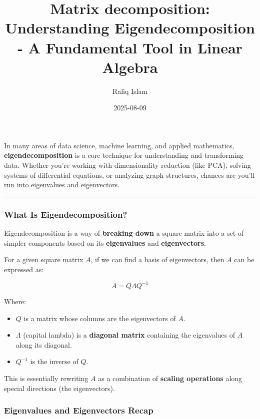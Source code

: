 \documentclass[
  letterpaper,
  DIV=11,
  numbers=noendperiod]{scrartcl}
\title{Matrix decomposition: Understanding Eigendecomposition - A
Fundamental Tool in Linear Algebra}
\author{Rafiq Islam}
\date{2025-08-09}
\providecommand{\tightlist}{%
  \setlength{\itemsep}{0pt}\setlength{\parskip}{0pt}}\usepackage{longtable,booktabs,array}
\renewcommand*\contentsname{Table of contents}
\newcommand\contentsname{Table of contents}
\begin{document}
\maketitle

\renewcommand*\contentsname{Table of contents}
{
\hypersetup{linkcolor=}
\setcounter{tocdepth}{4}
\tableofcontents
}

In many areas of data science, machine learning, and applied
mathematics, \textbf{eigendecomposition} is a core technique for
understanding and transforming data. Whether you're working with
dimensionality reduction (like PCA), solving systems of differential
equations, or analyzing graph structures, chances are you'll run into
eigenvalues and eigenvectors.

\begin{center}\rule{0.5\linewidth}{0.5pt}\end{center}

\subsubsection{What Is
Eigendecomposition?}\label{what-is-eigendecomposition}

Eigendecomposition is a way of \textbf{breaking down} a square matrix
into a set of simpler components based on its \textbf{eigenvalues} and
\textbf{eigenvectors}.

For a given square matrix \(A\), if we can find a basis of eigenvectors,
then \(A\) can be expressed as:

\[
A = Q \Lambda Q^{-1}
\]

Where:

\begin{itemize}
\tightlist
\item
  \(Q\) is a matrix whose columns are the eigenvectors of \(A\).
\item
  \(\Lambda\) (capital lambda) is a \textbf{diagonal matrix} containing
  the eigenvalues of \(A\) along its diagonal.
\item
  \(Q^{-1}\) is the inverse of \(Q\).
\end{itemize}

This is essentially rewriting \(A\) as a combination of \textbf{scaling
operations} along special directions (the eigenvectors).

\subsubsection{Eigenvalues and Eigenvectors
Recap}\label{eigenvalues-and-eigenvectors-recap}
\end{document}
